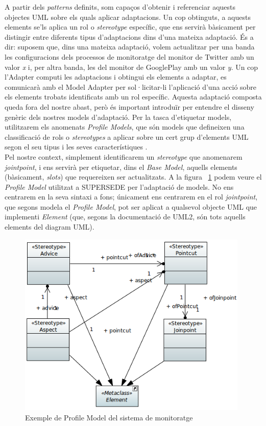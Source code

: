 A partir dels \textit{patterns} definits, som capaços d'obtenir i referenciar aquests objectes UML sobre els quals aplicar adaptacions. Un cop obtinguts, a aquests elements se'ls aplica un rol o \textit{stereotype} específic, que ens servirà bàsicament per distingir entre diferents tipus d'adaptacions dins d'una mateixa adaptació. És a dir: suposem que, dins una mateixa adaptació, volem actualitzar per una banda les configuracions dels processos de monitoratge del monitor de Twitter amb un valor \textit{x} i, per altra banda, les del monitor de GooglePlay amb un valor \textit{y}. Un cop l'Adapter computi les adaptacions i obtingui els elements a adaptar, es comunicarà amb el Model Adapter per sol·licitar-li l'aplicació d'una acció sobre els elements trobats identificats amb un rol específic. Aquesta adaptació composta queda fora del nostre abast, però és important introduïr per entendre el disseny genèric dels nostres models d'adaptació. Per la tasca d'etiquetar models, utilitzarem els anomenats \textit{Profile Models}, que són models que defineixen una classificació de rols o \textit{stereotypes} a aplicar sobre un cert grup d'elements UML segon el seu tipus i les seves característiques \cite{profile}.\\

Pel nostre context, simplement identificarem un \textit{stereotype} que anomenarem \textit{jointpoint}, i ens servirà per etiquetar, dins el \textit{Base Model}, aquells elements (bàsicament, \textit{slots}) que requereixen ser actualitzats. A la figura ~\ref{fig:profile} podem veure el \textit{Profile Model} utilitzat a SUPERSEDE per l'adaptació de models. No ens centrarem en la seva sintaxi a fons; únicament ens centrarem en el rol \textit{jointpoint}, que segons modela el \textit{Profile Model}, pot ser aplicat a qualsevol objecte UML que implementi \textit{Element} (que, segons la documentació de UML2, són tots aquells elements del diagram UML).\\

\begin{figure}
\centering
\includegraphics[width=11cm]{Figures/profile}
\decoRule
\caption{Exemple de Profile Model del sistema de monitoratge}
\label{fig:profile}
\end{figure}

